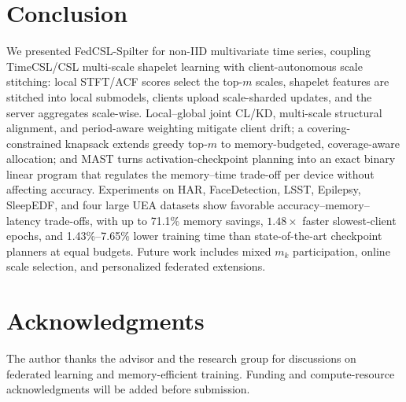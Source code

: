 \documentclass[sigconf]{acmart}
\begin{document}
\section{Conclusion}

We presented FedCSL-Spilter for non-IID multivariate time series, coupling
TimeCSL/CSL multi-scale shapelet learning with client-autonomous scale stitching:
local STFT/ACF scores select the top-$m$ scales, shapelet features are stitched
into local submodels, clients upload scale-sharded updates, and the server
aggregates scale-wise. Local--global joint CL/KD, multi-scale structural
alignment, and period-aware weighting mitigate client drift; a
covering-constrained knapsack extends greedy top-$m$ to memory-budgeted,
coverage-aware allocation; and MAST turns activation-checkpoint planning into an
exact binary linear program that regulates the memory--time trade-off per device
without affecting accuracy. Experiments on HAR, FaceDetection, LSST, Epilepsy,
SleepEDF, and four large UEA datasets show favorable
accuracy--memory--latency trade-offs, with up to 71.1\% memory savings,
$1.48\times$ faster slowest-client epochs, and 1.43\%--7.65\% lower training time
than state-of-the-art checkpoint planners at equal budgets. Future work includes
mixed $m_k$ participation, online scale selection, and personalized federated
extensions.

\section*{Acknowledgments}

The author thanks the advisor and the research group for discussions on
federated learning and memory-efficient training. Funding and compute-resource
acknowledgments will be added before submission.



\end{document}

